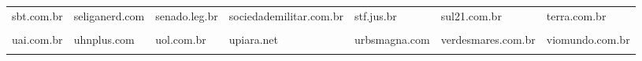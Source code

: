\begin{longtable}[t]{lllllll}
sbt.com.br & seliganerd.com & senado.leg.br & sociedademilitar.com.br & stf.jus.br & sul21.com.br & terra.com.br\\
\cellcolor{gray!10}{terrabrasilnoticias.com} & \cellcolor{gray!10}{theinvestor.com.br} & \cellcolor{gray!10}{tribunadonorte.com.br} & \cellcolor{gray!10}{tribunaonline.com.br} & \cellcolor{gray!10}{tribunapr.com.br} & \cellcolor{gray!10}{tse.jus.br} & \cellcolor{gray!10}{tupi.fm}\\
uai.com.br & uhnplus.com & uol.com.br & upiara.net & urbsmagna.com & verdesmares.com.br & viomundo.com.br\\
\cellcolor{gray!10}{visaodadireita.com} & \cellcolor{gray!10}{vistapatria.com.br} & \cellcolor{gray!10}{votosdeputados.com.br} & \cellcolor{gray!10}{vozdascomunidades.com.br} & \cellcolor{gray!10}{} & \cellcolor{gray!10}{} & \cellcolor{gray!10}{}\\*
\end{longtable}
